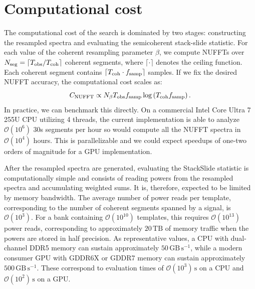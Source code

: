 \documentclass[aps,prd,amsmath,floats,floatfix, twocolumn,
superscriptaddress,nofootinbib,showpacs]{revtex4-2}
\begin{document}



\section{Computational cost}
\label{sec:cost}
The computational cost of the search is dominated by two stages: constructing the resampled spectra and evaluating the semicoherent stack-slide statistic. For each value of the coherent resampling parameter $\beta$, we compute NUFFTs over $N_{\rm seg} = \lceil T_{\rm obs}/T_{\rm coh}\rceil$ coherent segments, where $\lceil \cdot \rceil$ denotes the ceiling function. Each coherent segment contains $\lceil T_{\rm coh} \cdot f_{\rm samp}\rceil$ samples. If we fix the desired NUFFT accuracy, the computational cost scales as:
\begin{equation}
C_{\rm NUFFT}
\propto
N_\beta T_{\rm obs} f_{\rm samp}
\log\left(T_{\rm coh} f_{\rm samp}\right) .
\end{equation}
In practice, we can benchmark this directly. On a commercial Intel Core Ultra 7 255U CPU utilizing 4 threads, the current implementation is able to analyze $\mathcal{O}(10^6)$ 30s segments per hour so would compute all the NUFFT spectra in $\mathcal{O}(10^4)$ hours. This is parallelizable and we could expect speedups of one-two orders of magnitude for a GPU implementation. 

After the resampled spectra are generated, evaluating the StackSlide statistic is computationally simple and consists of reading powers from the resampled spectra and accumulating weighted sums. It is, therefore, expected to be limited by memory bandwidth. The average number of power reads per template, corresponding to the number of coherent segments spanned by a signal, is $\mathcal{O}(10^3)$. For a bank containing $\mathcal{O}(10^{10})$ templates, this requires $\mathcal{O}(10^{13})$ power reads, corresponding to approximately $20\,\mathrm{TB}$ of memory traffic when the powers are stored in half precision. As representative values, a CPU with dual-channel DDR5 memory can sustain approximately $50\,\mathrm{GB\,s^{-1}}$, while a modern consumer GPU with GDDR6X or GDDR7 memory can sustain approximately $500\,\mathrm{GB\,s^{-1}}$. These correspond to evaluation times of $\mathcal{O}(10^3)\,\mathrm{s}$ on a CPU and $\mathcal{O}(10^2)\,\mathrm{s}$ on a GPU.
\end{document}
